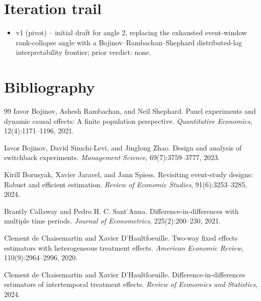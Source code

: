\documentclass[11pt]{article}
\theoremstyle{definition}
\theoremstyle{plain}
\theoremstyle{remark}
\begin{document}
\section{Iteration trail}
\begin{itemize}[leftmargin=*]
\item v1 (pivot) -- initial draft for angle 2, replacing the exhausted event-window rank-collapse angle with a Bojinov--Rambachan--Shephard distributed-lag interpretability frontier; prior verdict: none.
\end{itemize}

\section*{Bibliography}
\begin{thebibliography}{99}
Iavor Bojinov, Ashesh Rambachan, and Neil Shephard.
\newblock Panel experiments and dynamic causal effects: A finite population perspective.
\newblock \emph{Quantitative Economics}, 12(4):1171--1196, 2021.

Iavor Bojinov, David Simchi-Levi, and Jinglong Zhao.
\newblock Design and analysis of switchback experiments.
\newblock \emph{Management Science}, 69(7):3759--3777, 2023.

Kirill Borusyak, Xavier Jaravel, and Jann Spiess.
\newblock Revisiting event-study designs: Robust and efficient estimation.
\newblock \emph{Review of Economic Studies}, 91(6):3253--3285, 2024.

Brantly Callaway and Pedro H. C. Sant'Anna.
\newblock Difference-in-differences with multiple time periods.
\newblock \emph{Journal of Econometrics}, 225(2):200--230, 2021.

Clement de Chaisemartin and Xavier D'Haultfoeuille.
\newblock Two-way fixed effects estimators with heterogeneous treatment effects.
\newblock \emph{American Economic Review}, 110(9):2964--2996, 2020.

Clement de Chaisemartin and Xavier D'Haultfoeuille.
\newblock Difference-in-differences estimators of intertemporal treatment effects.
\newblock \emph{Review of Economics and Statistics}, 2024.


\end{thebibliography}
\end{document}
